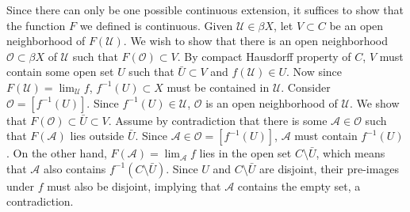 \documentclass{article}
\begin{document}
\begin{enumerate}
    Since there can only be one possible continuous extension, it suffices
    to show that the function $F$ we defined is continuous. Given
    $\mathcal{U}\in\beta X$, let $V\subset C$ be an open neighborhood of
    $F(\mathcal{U})$. We wish to show that there is an open neighborhood
    $\mathcal{O}\subset\beta X$ of $\mathcal{U}$ such that
    $F(\mathcal{O})\subset V$. By compact Hausdorff property of $C$, $V$
    must contain some open set $U$ such that $\bar{U}\subset V$ and
    $f(\mathcal{U})\in U$. Now since $F(\mathcal{U})=\lim_{\mathcal{U}}f$,
    $f^{-1}(U)\subset X$ must be contained in $\mathcal{U}$. Consider
    $\mathcal{O}=[f^{-1}(U)]$. Since $f^{-1}(U)\in\mathcal{U}$,
    $\mathcal{O}$ is an open neighborhood of $\mathcal{U}$. We show that
    $F(\mathcal{O})\subset\bar{U}\subset V$. Assume by contradiction that
    there is some $\mathcal{A}\in\mathcal{O}$ such that $F(\mathcal{A})$
    lies outside $\bar{U}$. Since $\mathcal{A}\in\mathcal{O}=[f^{-1}(U)]$,
    $\mathcal{A}$ must contain $f^{-1}(U)$. On the other hand,
    $F(\mathcal{A})=\lim_{\mathcal{A}}f$ lies in the open set
    $C\setminus\bar{U}$, which means that $\mathcal{A}$ also contains
    $f^{-1}(C\setminus\bar{U})$. Since $U$ and $C\setminus\bar{U}$ are
    disjoint, their pre-images under $f$ must also be disjoint, implying
    that $\mathcal{A}$ contains the empty set, a contradiction.
\end{enumerate}
\end{document}
